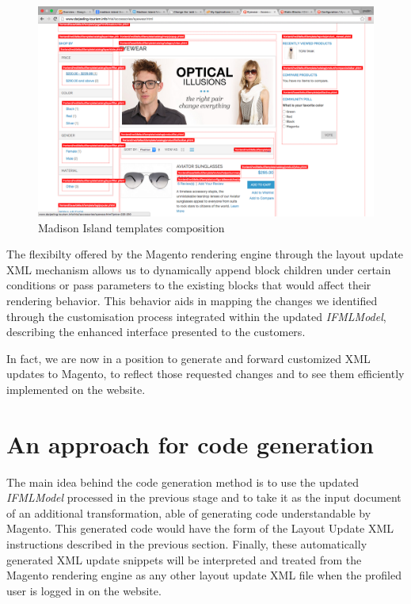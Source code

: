 \vspace{0.5cm}
\begin{figure}[H]
  \centering
    \includegraphics[width=14cm]{images/magento/madison-island-theme.png}
  \caption{Madison Island templates composition}
  \label{fig:magento-madison-island-theme}
\end{figure}
\vspace{0.5cm}

The flexibilty offered by the Magento rendering engine through the layout update XML mechanism allows us to dynamically append block children under certain conditions or pass parameters to the existing blocks that would affect their rendering behavior. This behavior aids in mapping the changes we identified through the customisation process integrated within the updated \textit{IFMLModel}, describing the enhanced interface presented to the customers.

In fact, we are now in a position to generate and forward customized XML updates to Magento, to reflect those requested changes and to  see them efficiently implemented on the website.

\newpage
\section{An approach for code generation}

The main idea behind the code generation method is to use the updated \textit{IFMLModel} processed in the previous stage and to take it as the input document of an additional transformation, able of generating code understandable by Magento. This generated code would have the form of the Layout Update XML instructions described in the previous section. Finally, these automatically generated XML update snippets will be interpreted and treated from the Magento rendering engine as any other layout update XML file when the profiled user is logged in on the website.

